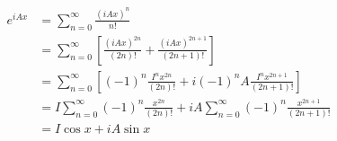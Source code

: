 \begingroup
%
\begin{align*}
e^{i A x} &= \sum_{n=0}^{\infty}{\frac{\left( iAx \right)^n}{n!}} \\
&= \sum_{n=0}^{\infty}{\left[ \frac{\left( iAx \right)^{2n}}{\left( 2n \right)!} + \frac{\left( iAx \right)^{2n+1}}{\left( 2n + 1 \right)!} \right]} \\
&= \sum_{n=0}^{\infty}{\left[ \left( -1 \right)^n \frac{I^n x^{2n}}{\left( 2n \right)!} + i \left( - 1 \right)^n A \frac{I^n x^{2n+1}}{\left( 2n + 1 \right)!} \right]} \\
&= I \sum_{n=0}^{\infty}{\left( -1 \right)^n \frac{x^{2n}}{\left( 2n \right)!}} + i A \sum_{n=0}^{\infty}{\left( - 1 \right)^n \frac{x^{2n+1}}{\left( 2n + 1 \right)!}} \\
&= I \cos x + i A \sin x
\end{align*}
\endgroup
